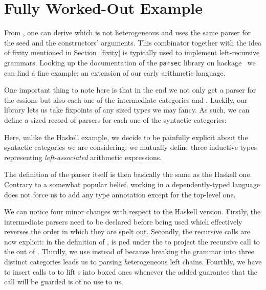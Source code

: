 \section{Fully Worked-Out Example}

From , one can derive  which is not heterogeneous
and uses the same parser for the seed and the constructors' arguments.
This combinator together with the idea of fixity mentioned in Section~\ref{fixity}
is typically used to implement left-recursive grammars. Looking up the
documentation of the \texttt{parsec} library on hackage~\cite{doc:parsec}
we can find a fine example: an extension of our early arithmetic language.


One important thing to note here is that in the end we not only get a
parser for the essions but also each one of the intermediate
categories  and . Luckily, our library lets us
take fixpoints of any sized types we may fancy. As such, we can define
a sized record of parsers for each one of the syntactic categories:


Here, unlike the Haskell example, we decide to be painfully explicit
about the syntactic categories we are considering: we mutually define
three inductive types representing \emph{left-associated} arithmetic
expressions.

\begin{minipage}{0.33\textwidth}
\end{minipage}
\begin{minipage}{0.35\textwidth}
\end{minipage}
\begin{minipage}{0.20\textwidth}
\end{minipage}

The definition of the parser itself is then basically the same as the
Haskell one. Contrary to a somewhat popular belief, working in a
dependently-typed language does not force us to add any type annotation
except for the top-level one.


We can notice four minor changes with respect to the Haskell version. Firstly,
the intermediate parsers need to be declared before being used which effectively
reverses the order in which they are spelt out. Secondly, the recursive calls
are now explicit: in the definition of ,  is ped
under the \BOX{} to project the recursive call to the   out
of . Thirdly, we use  instead of  because
breaking the grammar into three distinct categories leads us to parsing
\emph{h}eterogeneous left chains. Fourthly, we have to insert calls to 
to lift s into boxed ones whenever the added guarantee that the call
will be guarded is of no use to us.

